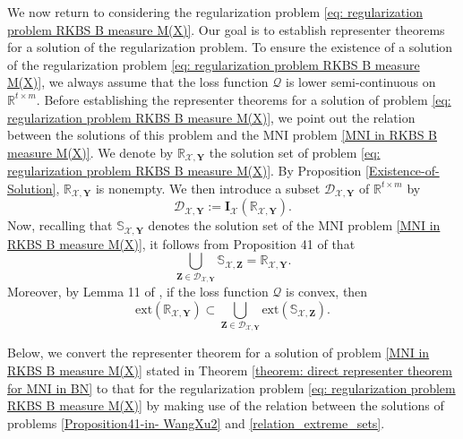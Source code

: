 \documentclass[11pt]{article}
\begin{document}
We now return to considering the regularization problem \eqref{eq: regularization problem RKBS B measure M(X)}. Our goal is to  establish representer theorems for a solution of the regularization problem. To ensure the existence of a solution of the regularization problem \eqref{eq: regularization problem RKBS B measure M(X)}, we always assume that the loss function $\mathcal{Q}$ is lower
semi-continuous on $\mathbb{R}^{t\times m}$. 
Before establishing the representer theorems for a solution of problem \eqref{eq: regularization problem RKBS B measure M(X)}, we point out the relation between the solutions of this problem and the MNI problem \eqref{MNI in RKBS B measure M(X)}. We denote by $\mathbb{R}_{\mathcal{X},\mathbf{Y}}$ the solution set of problem \eqref{eq: regularization problem RKBS B measure M(X)}. By Proposition \ref{Existence-of-Solution}, $\mathbb{R}_{\mathcal{X},\mathbf{Y}}$ is nonempty. We then introduce a subset $\mathcal{D}_{\mathcal{X},\mathbf{Y}}$ of $\mathbb{R}^{t\times m}$ by  
\begin{equation}\label{general Dy}
\mathcal{D}_{\mathcal{X},\mathbf{Y}}:=\mathbf{I}_{\mathcal{X}}(\mathbb{R}_{\mathcal{X},\mathbf{Y}}). 
\end{equation}
Now, recalling that $\mathbb{S}_{\mathcal{X},\mathbf{Y}}$ denotes the solution set of the MNI problem \eqref{MNI in RKBS B measure M(X)}, 
it follows from  Proposition 41 of \cite{wang2021representer} that
%
%
%
\begin{equation}\label{Proposition41-in- WangXu2}
\bigcup_{{\mathbf{Z}}\in\mathcal{D}_{\mathcal{X},\mathbf{Y}}}\mathbb{S}_{\mathcal{X},\mathbf{Z}}=\mathbb{R}_{\mathcal{X},\mathbf{Y}}. 
\end{equation}
Moreover, by Lemma 11 of \cite{wang2023sparse},  if the loss function $\mathcal{Q}$ is convex, then  
    \begin{equation}\label{relation_extreme_sets}
        \mathrm{ext}\left(\mathbb{R}_{\mathcal{X},\mathbf{Y}}\right)\subset\bigcup_{\mathbf{Z}\in\mathcal{D}_{\mathcal{X},\mathbf{Y}}}\mathrm{ext}\left(\mathbb{S}_{\mathcal{X},\mathbf{Z}}\right).
    \end{equation}

Below, we convert the representer theorem for a solution of problem \eqref{MNI in RKBS B measure M(X)} stated in Theorem \ref{theorem: direct representer theorem for MNI in BN} to that for the regularization problem \eqref{eq: regularization problem RKBS B measure M(X)} by making use of the relation between the solutions of problems \eqref{Proposition41-in- WangXu2} and \eqref{relation_extreme_sets}.
\end{document}
